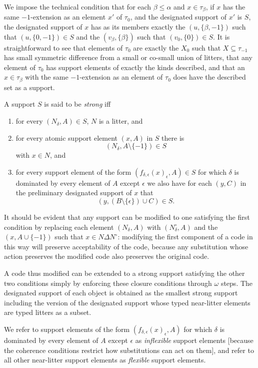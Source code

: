 \documentclass[12pt]{article}
\begin{document}
\begin{enumerate}
We impose the technical condition that for each $\beta \leq \alpha$ and $x \in \tau_\beta$, if $x$ has the same $-1$-extension as an element $x'$  of $\tau_0$, and the designated support of $x'$ is $S$, the designated support of $x$ has as its members exactly the $(u,\{\beta,-1\})$ such that $(u,\{0,-1\}) \in S$ and the $(v_\beta,\{\beta\})$ such
that $(v_0,\{0\})\in S$.  It is straightforward to see that elements of $\tau_0$ are exactly the $X_0$ such that $X \subseteq \tau_{-1}$ has small symmetric difference from a small or co-small union of litters, that any element of $\tau_0$ has support elements of exactly the kinds described, and that an $x \in \tau_\beta$ with the same $-1$-extension as
an element of $\tau_0$ does have the described set as a support.

A support $S$ is said to be {\em strong\/} iff

\begin{enumerate}

\item for every $(N_\delta,A) \in S$, $N$ is a litter, and
\item  for every atomic support element $(x,A)$ in $S$ there is $$(N_\delta,A\setminus\{-1\}) \in S$$ with $x \in N$, and 

\item for every support element of the form $(f_{\delta,\epsilon}(x)_\epsilon,A) \in S$ for which $\delta$ is dominated by every element of $A$ except $\epsilon$ we also have for each $(y,C)$ in the preliminary designated support
of $x$ that $$(y,(B \setminus \{\epsilon\})\cup C)\in S.$$

\end{enumerate}  It should be evident that any support can be modified to one satisfying the first condition by replacing each element
$(N_\delta,A)$ with $(N^\circ_\delta,A)$ and the $(x,A\cup \{-1\})$ such that $x \in N \Delta N^\circ$:  modifying the first component of a code
in this way will preserve acceptability of the code, because any substitution whose action preserves the modified code also preserves the original code.

A code thus modified can be extended to a strong support satisfying the other two conditions simply by enforcing these closure conditions through $\omega$ steps.  The designated support  of each object is obtained as the  smallest strong support including the version of the designated support whose typed near-litter elements are typed litters  as a subset.

We refer to support elements of the form $(f_{\delta,\epsilon}(x)_\epsilon,A)$ for which $\delta$ is dominated by every element of $A$ except $\epsilon$ as {\em inflexible\/} support elements [because the coherence conditions restrict how substitutions can act on them], and refer to all other near-litter support elements as {\em flexible\/} support elements.


\end{enumerate}
\end{document}
